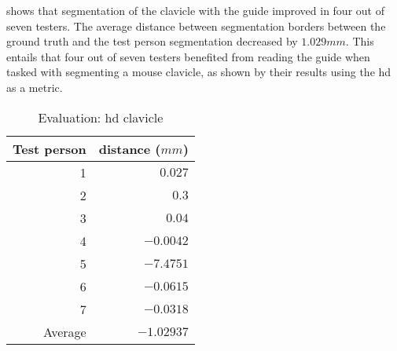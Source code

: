 \noindent
{} shows that segmentation of the clavicle with the guide improved in four out of seven testers.
The average distance between segmentation borders between the ground truth and the test person segmentation decreased by $1.029mm$.
This entails that four out of seven testers benefited from reading the guide when tasked with segmenting a mouse clavicle, as shown by their results using the \acrlong{hd} as a metric.
\begin{table}[ht]
	\begin{center}
		\begin{tabular}{r r}
			\textbf{Test person} & \textbf{distance ($mm$)} \\
			\hline
			1                    & $0.027$                  \\
			2                    & $0.3$                    \\
			3                    & $0.04$                   \\
			4                    & $-0.0042$                \\
			5                    & $-7.4751$                \\
			6                    & $-0.0615$                \\
			7                    & $-0.0318$                \\
			\hline
			Average              & $-1.02937$               \\
		\end{tabular}
		\caption{Evaluation: \acrshort{hd} clavicle}\label{tab:clavicle-distance}
	\end{center}
\end{table}



